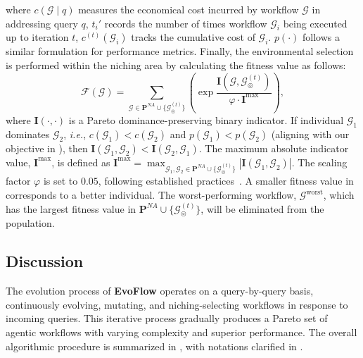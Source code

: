 \documentclass{article}
\theoremstyle{plain}
\theoremstyle{definition}
\theoremstyle{remark}
\newcommand{\ourmethod}{{\fontfamily{lmtt}\selectfont \textbf{EvoFlow}}\xspace}
\begin{document}
where \(c(\mathcal{G} \mid q)\) measures the economical cost incurred by workflow \(\mathcal{G}\) in addressing query \(q\), \(t_i'\) records the number of times workflow \(\mathcal{G}_i\) being executed up to iteration \(t\), \(c^{(t)}(\mathcal{G}_i)\) tracks the cumulative cost of \(\mathcal{G}_i\). \(p(\cdot)\) follows a similar formulation for performance metrics. Finally, the environmental selection is performed within the niching area by calculating the fitness value as follows:  
\begin{equation}\label{eq:fitness}
\mathcal{F}(\mathcal{G}) = \sum_{\mathcal{G} \in \mathbf{P}^{NA} \cup \{\mathcal{G}_\circledcirc^{(t)}\}} \left(\exp \frac{\mathbf{I}(\mathcal{G}, \mathcal{G}_\circledcirc^{(t)})}{\varphi \cdot \mathbf{I}^{\max}}\right),
\end{equation}  
where \(\mathbf{I}(\cdot, \cdot)\) is a Pareto dominance-preserving binary indicator. If individual \(\mathcal{G}_1\) dominates \(\mathcal{G}_2\), \textit{i.e.}, \(c(\mathcal{G}_1) < c(\mathcal{G}_2)\) and \(p(\mathcal{G}_1) < p(\mathcal{G}_2)\) (aligning with our objective in ), then \(\mathbf{I}(\mathcal{G}_1, \mathcal{G}_2) < \mathbf{I}(\mathcal{G}_2, \mathcal{G}_1)\). The maximum absolute indicator value, \(\mathbf{I}^{\max}\), is defined as $
\mathbf{I}^{\max} = \max_{\mathcal{G}_1, \mathcal{G}_2 \in \mathbf{P}^{NA} \cup \{\mathcal{G}_\circledcirc^{(t)}\}} |\mathbf{I}(\mathcal{G}_1, \mathcal{G}_2)|$.  
The scaling factor \(\varphi\) is set to \(0.05\), following established practices~\citep{zitzler2004indicator}. A smaller fitness value in  corresponds to a better individual. The worst-performing workflow, \(\mathcal{G}^{\text{worst}}\), which has the largest fitness value in \(\mathbf{P}^{NA} \cup \{\mathcal{G}_\circledcirc^{(t)}\}\), will be eliminated from the population.


\vspace{-0.5em}
\subsection{Discussion}
\vspace{-0.6em}
The evolution process of \ourmethod operates on a query-by-query basis, continuously evolving, mutating, and niching-selecting workflows in response to incoming queries. This iterative process gradually produces a Pareto set of agentic workflows with varying complexity and superior performance. The overall algorithmic procedure is summarized in , with notations clarified in .
\end{document}
